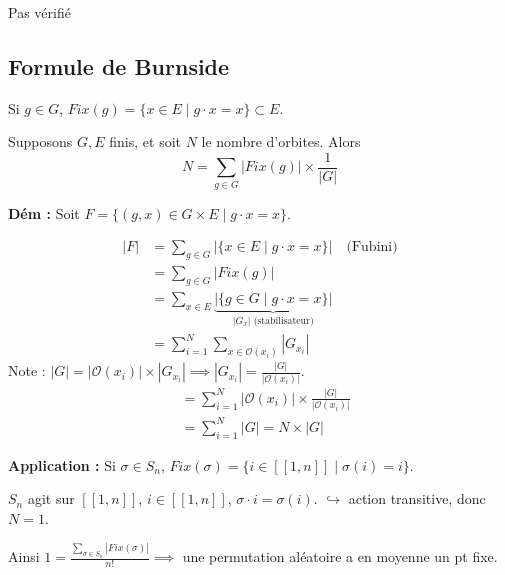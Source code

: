 Pas vérifié

\subsection*{Formule de Burnside}

Si $g \in G$, $Fix(g) = \{ x \in E \mid g \cdot x = x \} \subset E$.

\begin{theorement}
Supposons $G, E$ finis, et soit $N$ le nombre d'orbites.
Alors \[ N = \sum_{g \in G} |Fix(g)| \times \frac{1}{|G|} \]
\end{theorement}

\textbf{Dém :} Soit $F = \{ (g,x) \in G \times E \mid g \cdot x = x \}$.

\noindent\begin{minipage}{0.65\textwidth}
\begin{align*}
|F| &= \sum_{g \in G} |\{ x \in E \mid g \cdot x = x \}| \quad \text{(Fubini)} \\
    &= \sum_{g \in G} |Fix(g)| \\
    &= \sum_{x \in E} \underbrace{|\{ g \in G \mid g \cdot x = x \}|}_{|G_x| \text{ (stabilisateur)}} \\
    &= \sum_{i=1}^N \sum_{x \in \mathcal{O}(x_i)} |G_{x_i}|
\end{align*}
Note : $|G| = |\mathcal{O}(x_i)| \times |G_{x_i}| \implies |G_{x_i}| = \frac{|G|}{|\mathcal{O}(x_i)|}$.
\begin{align*}
    &= \sum_{i=1}^N |\mathcal{O}(x_i)| \times \frac{|G|}{|\mathcal{O}(x_i)|} \\
    &= \sum_{i=1}^N |G| = N \times |G|
\end{align*}
\end{minipage}%
\begin{minipage}{0.35\textwidth}
\centering
{}
\end{minipage}

\vspace{0.5cm}

\begin{exemple}
\textbf{Application :} Si $\sigma \in S_n$, $Fix(\sigma) = \{ i \in [\![ 1, n ]\!] \mid \sigma(i) = i \}$.

$S_n$ agit sur $[\![ 1, n ]\!]$, $i \in [\![ 1, n ]\!]$, $\sigma \cdot i = \sigma(i)$.
$\hookrightarrow$ action transitive, donc $N=1$.

Ainsi $1 = \frac{\sum_{\sigma \in S_n} |Fix(\sigma)|}{n!} \implies$ une permutation aléatoire a en moyenne un pt fixe.
\end{exemple}

